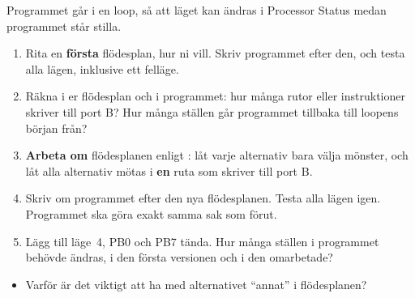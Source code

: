Programmet går i en loop, så att läget kan ändras i Processor Status medan programmet står
stilla.

\begin{enumerate}
  \item Rita en \textbf{första} flödesplan, hur ni vill. Skriv programmet efter den, och testa alla
    lägen, inklusive ett felläge.
  \item Räkna i er flödesplan och i programmet: hur många rutor eller instruktioner skriver till
    port B? Hur många ställen går programmet tillbaka till loopens början från?
  \item \textbf{Arbeta om} flödesplanen enligt : låt varje alternativ bara välja
    mönster, och låt alla alternativ mötas i \textbf{en} ruta som skriver till port B.
  \item Skriv om programmet efter den nya flödesplanen. Testa alla lägen igen. Programmet ska göra
    exakt samma sak som förut.
  \item Lägg till läge~4, PB0 och PB7 tända. Hur många ställen i programmet behövde ändras, i den
    första versionen och i den omarbetade?
\end{enumerate}

\begin{itemize}
  \item Varför är det viktigt att ha med alternativet \enquote{annat} i flödesplanen?
\end{itemize}

